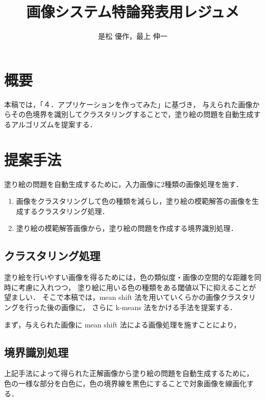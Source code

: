 \documentclass[dvipdfmx]{jsarticle}
\begin{document}
\title{画像システム特論発表用レジュメ}
\author{是松 優作，最上 伸一}

\setlength{\baselineskip}{4.4mm}	%
\maketitle
\thispagestyle{empty}
\pagestyle{empty}

\section{概要}
本稿では，「４．アプリケーションを作ってみた」に基づき，
与えられた画像からその色境界を識別してクラスタリングすることで，塗り絵の問題を自動生成するアルゴリズムを提案する．

\section{提案手法}

塗り絵の問題を自動生成するために，入力画像に2種類の画像処理を施す．
\begin{enumerate}
\item 画像をクラスタリングして色の種類を減らし，塗り絵の模範解答の画像を生成する{\gtfamily クラスタリング処理}．
\item 塗り絵の模範解答画像から，塗り絵の問題を作成する{\gtfamily 境界識別処理}．
\end{enumerate}

\subsection{クラスタリング処理}
塗り絵を行いやすい画像を得るためには，色の類似度・画像の空間的な距離を同時に考慮に入れつつ，
塗り絵に用いる色の種類をある閾値以下に抑えることが望ましい．
そこで本稿では，mean shift 法を用いていくらかの画像クラスタリングを行った後の画像に，
さらに k-means 法をかける手法を提案する．

まず，与えられた画像に mean shift 法による画像処理を施すことにより，



\subsection{境界識別処理}
上記手法によって得られた正解画像から塗り絵の問題を自動生成するために，
色の一様な部分を白色に，色の境界線を黒色にすることで対象画像を線画化する．
\end{document}
